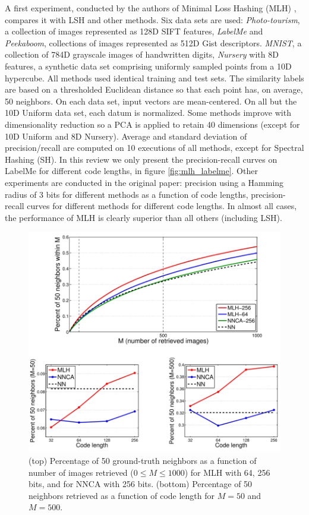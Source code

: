 A first experiment, conducted by the authors of Minimal Loss Hashing (MLH) \cite{norouzi2011minimal}, compares it with LSH and other methods. Six data sets are used: \textit{Photo-tourism}, a collection of images represented as 128D SIFT features, \textit{LabelMe} and \textit{Peekaboom}, collections of images represented as 512D Gist descriptors. \textit{MNIST}, a collection of 784D grayscale images of handwritten digits, \textit{Nursery} with 8D features, a synthetic data set comprising uniformly sampled points from a 10D hypercube. All methods used identical training and test sets. The similarity labels are based on a thresholded Euclidean distance so that each point has, on average, 50 neighbors. On each data set, input vectors are mean-centered. On all but the 10D Uniform data set, each datum is normalized. Some methods improve with dimensionality reduction so a PCA is applied to retain 40 dimensions (except for 10D Uniform and 8D Nursery). Average and standard deviation of precision/recall are computed on 10 executions of all methods, except for Spectral Hashing (SH). In this review we only present the precision-recall curves on LabelMe for different code lengths, in figure \ref{fig:mlh_labelme}. Other experiments are conducted in the original paper: precision using a Hamming radius of 3 bits for different methods as a function of code lengths, precision-recall curves for different methods for different code lengths. In almost all cases, the performance of MLH is clearly superior than all others (including LSH).

\begin{figure}
	\includegraphics[width=\textwidth]{semantic_search_mlh_nnca.png}
	\caption{(top) Percentage of 50 ground-truth neighbors as a function of number of images retrieved ($0 \leq M \leq 1000$) for MLH with 64, 256 bits, and for NNCA with 256 bits. (bottom) Percentage of 50 neighbors retrieved as a function of code length for $M=50$ and $M=500$. \cite{norouzi2011minimal}}
	\label{fig:semantic_search_mlh_nnca}	
\end{figure}

